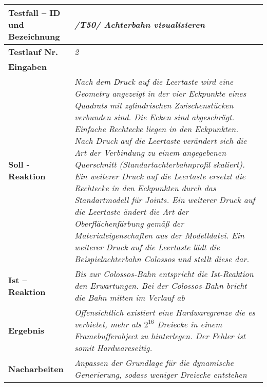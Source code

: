 \begin{longtable}{|p{7cm}|p{10cm}|}
\hline
\textbf{Testfall -- ID und Bezeichnung} & \textit{ /T50/ Achterbahn visualisieren} \\
\hline
\textbf{Testlauf Nr.} & \textit{2} \\
\hline
\textbf{Eingaben} & \textit{} \\
\hline
\textbf{Soll - Reaktion} & \textit{Nach dem Druck auf die Leertaste wird eine Geometry angezeigt in der vier Eckpunkte eines Quadrats mit zylindrischen Zwischenstücken verbunden sind. Die Ecken sind abgeschrägt. Einfache Rechtecke liegen in den Eckpunkten.
Nach Druck auf die Leertaste verändert sich die Art der Verbindung zu einem angegebenen Querschnitt (Standartachterbahnprofil skaliert). Ein weiterer Druck auf die Leertaste ersetzt die Rechtecke in den Eckpunkten durch 
das Standartmodell für Joints. Ein weiterer Druck auf die Leertaste ändert die Art der Oberflächenfärbung gemäß der Materialeigenschaften aus der Modelldatei. Ein weiterer Druck auf die Leertaste lädt die Beispielachterbahn Colossos und stellt diese dar.
} \\
\hline
\textbf{Ist -- Reaktion} & \textit{Bis zur Colossos-Bahn entspricht die Ist-Reaktion den Erwartungen. Bei der Colossos-Bahn bricht die Bahn mitten im Verlauf ab} \\
\hline
\textbf{Ergebnis} & \textit{Offensichtlich existiert eine Hardwaregrenze die es verbietet, mehr als $2^{16}$ Dreiecke in einem Framebufferobject zu hinterlegen. Der Fehler ist somit Hardwareseitig.} \\
\hline
\textbf{Nacharbeiten } & \textit{Anpassen der Grundlage für die dynamische Generierung, sodass weniger Dreiecke entstehen} \\
\hline
 \end{longtable}


